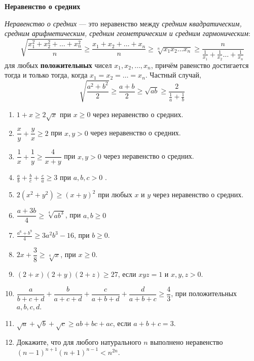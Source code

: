 \documentclass{article}
\begin{document}
\large
	
	
\begin{center}
	\textbf{Неравенство о средних}
\end{center}
	

\textit{Неравенство о средних} — это неравенство между \textit{средним квадратическим, средним арифметическим, средним геометрическим и средним гармоническим}: $$\sqrt{\frac{x_1^2+x_2^2+\dots+x_n^2}{n}}\ge\frac{x_1+x_2+\dots+x_n}{n}\ge\sqrt[n]{x_1x_2\dots x_n}\ge \dfrac{n}{\frac{1}{x_1}+\frac{1}{x_2}\dots+\frac{1}{x_n}}$$для любых \textbf{положительных} чисел $x_1, x_2, \dots , x_n$, причём равенство достигается тогда и только
тогда, когда $x_1 =x_2 =\dotsc=x_n$.
Частный случай, 
$$\sqrt{\dfrac{a^2 + b^2}{2}} \ge \dfrac{a+b}{2} \ge \sqrt{ab}  \ge \dfrac{2}{\frac{1}{a}+\frac{1}{b}}$$
	
\begin{enumerate}[label*=\protect\fbox{\arabic{enumi}}]

\item $1+x\ge 2\sqrt{x}$ при $x \geqslant 0$ через неравенство о средних.

\item $\dfrac{x}{y} + \dfrac{y}{x} \geqslant 2$  при $x, y > 0$ через неравенство о средних.

\item $\dfrac{1}{x}+\dfrac{1}{y}\geqslant\dfrac{4}{x+y}$ при $x, y > 0$ через неравенство о средних.

\item $\displaystyle \frac{a}{b} + \frac{b}{c} + \frac{c}{a} \geq 3$ при $a, b, c > 0$ .

\item $2(x^2 + y^2) \geqslant (x + y)^2$  при любых $x$ и $y$ через неравенство о средних.

\item $\dfrac{a+3b}{4}\geqslant \sqrt[4]{ab^3}$, при $a, b \geqslant 0$

\item $\displaystyle \frac{a^6 + b^9}{4}\geqslant 3a^2b^3-16$, при $b \geqslant 0$.

\item  $2x + \dfrac{3}{8} \geqslant \sqrt[4]{x}$, при $x \geqslant 0$.

\item $(2+x)(2+y)(2+z) \geqslant 27$, если $xyz = 1$ и $x, y, z > 0$.

\item $\dfrac{a}{b + c + d} + \dfrac{b}{a + c + d} + \dfrac{c}{a + b + d} + \dfrac{d}{a + b + c} \geqslant \dfrac{4}{3}$, при положительных $a, b, c, d$.

\item $\sqrt{a}+\sqrt{b}+\sqrt{c}\geqslant ab+bc+ac$, если $a+b+c = 3$.

\item Докажите, что для любого натурального $n$ выполнено неравенство  \\$(n - 1)^{n+1}(n + 1)^{n-1}< n^{2n}$.
		
	\end{enumerate}
\end{document}
